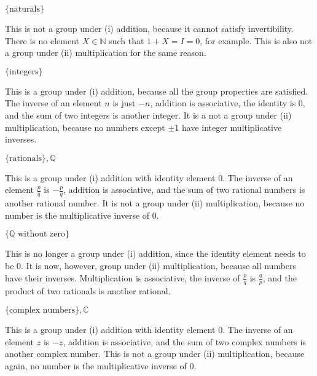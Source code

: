 \documentclass[../key.tex]{subfiles}
\begin{document}
\begin{inner_problem}
\item $\{\text{naturals}\}$
\end{inner_problem}

This is not a group under (i) addition, because it cannot satisfy invertibility. There is no element $X\in \mathbb{N}$ such that $1+X=I=0$, for example. This is also not a group under (ii) multiplication for the same reason.

\begin{inner_problem}
\item $\{\text{integers}\}$
\end{inner_problem}

This is a group under (i) addition, because all the group properties are satisfied. The inverse of an element $n$ is just $-n$, addition is associative, the identity is $0$, and the sum of two integers is another integer. It is a not a group under (ii) multiplication, because no numbers except $\pm 1$ have integer multiplicative inverses.

\begin{inner_problem}
\item $\{\text{rationals}\}, \mathbb{Q}$
\end{inner_problem}

This is a group under (i) addition with identity element $0$. The inverse of an element $\frac{p}{q}$ is $-\frac{p}{q}$, addition is associative, and the sum of two rational numbers is another rational number. It is not a group under (ii) multiplication, because no number is the multiplicative inverse of $0$.

\begin{inner_problem}
\item $\{\mathbb{Q}\text{ without zero}\}$
\end{inner_problem}

This is no longer a group under (i) addition, since the identity element needs to be $0$. It is now, however, group under (ii) multiplication, because all numbers have their inverses. Multiplication is associative, the inverse of $\frac{p}{q}$ is $\frac{q}{p}$, and the product of two rationals is another rational.

\begin{inner_problem}
\item $\{\text{complex numbers}\}, \mathbb{C}$
\end{inner_problem}

This is a group under (i) addition with identity element $0$. The inverse of an element $z$ is $-z$, addition is associative, and the sum of two complex numbers is another complex number. This is not a group under (ii) multiplication, because again, no number is the multiplicative inverse of $0$.
\end{document}
